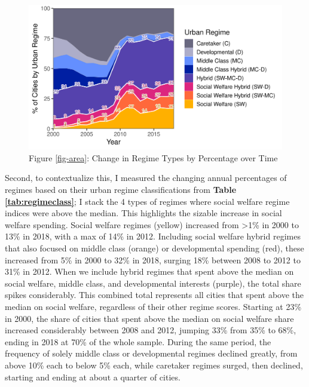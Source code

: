 \documentclass[preprint, 3p,
authoryear]{elsarticle} %
\begin{document}
\begin{figure}
\includegraphics[width=1\linewidth]{viz/percent_area} \caption{Figure \ref{fig-area}\label{fig-area}: Change in Regime Types by Percentage over Time}\label{fig:area}
\end{figure}

\doublespacing

Second, to contextualize this, I measured the changing annual
percentages of regimes based on their urban regime classifications from
\textbf{Table \ref{tab:regimeclass}}; I stack the 4 types of regimes
where social welfare regime indices were above the median. This
highlights the sizable increase in social welfare spending. Social
welfare regimes (yellow) increased from \textgreater1\% in 2000 to 13\%
in 2018, with a max of 14\% in 2012. Including social welfare hybrid
regimes that also focused on middle class (orange) or developmental
spending (red), these increased from 5\% in 2000 to 32\% in 2018,
surging 18\% between 2008 to 2012 to 31\% in 2012. When we include
hybrid regimes that spent above the median on social welfare, middle
class, and developmental interests (purple), the total share spikes
considerably. This combined total represents all cities that spent above
the median on social welfare, regardless of their other regime scores.
Starting at 23\% in 2000, the share of cities that spent above the
median on social welfare share increased considerably between 2008 and
2012, jumping 33\% from 35\% to 68\%, ending in 2018 at 70\% of the
whole sample. During the same period, the frequency of solely middle
class or developmental regimes declined greatly, from above 10\% each to
below 5\% each, while caretaker regimes surged, then declined, starting
and ending at about a quarter of cities.
\end{document}
